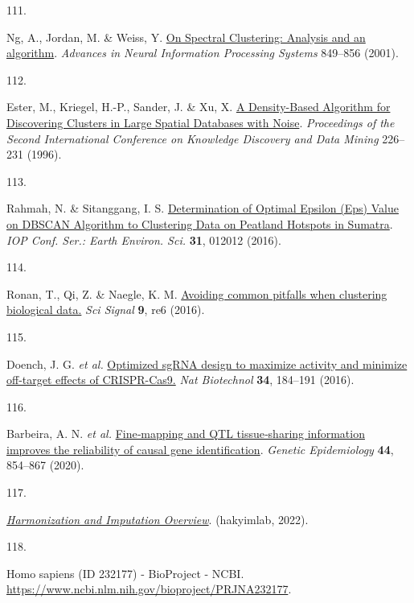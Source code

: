 \documentclass[
  a4paper,
]{article}
\newlength{\cslhangindent}
\newlength{\csllabelwidth}
\newlength{\cslentryspacingunit} %
\newenvironment{CSLReferences}[2] %
 {%
  \setlength{\parindent}{0pt}
  \ifodd #1
  \let\oldpar\par
  \def\par{\hangindent=\cslhangindent\oldpar}
  \fi
  \setlength{\parskip}{#2\cslentryspacingunit}
 }%
 {}
\newcommand{\CSLLeftMargin}[1]{\parbox[t]{\csllabelwidth}{#1}}
\newcommand{\CSLRightInline}[1]{\parbox[t]{\linewidth - \csllabelwidth}{#1}\break}
\begin{document}
\begin{CSLReferences}{0}{0}
\leavevmode{}%
\CSLLeftMargin{111. }%
\CSLRightInline{Ng, A., Jordan, M. \& Weiss, Y. \href{https://ai.stanford.edu/~ang/papers/nips01-spectral.pdf}{On Spectral Clustering: Analysis and an algorithm}. \emph{Advances in Neural Information Processing Systems} 849--856 (2001).}

\leavevmode{}%
\CSLLeftMargin{112. }%
\CSLRightInline{Ester, M., Kriegel, H.-P., Sander, J. \& Xu, X. \href{https://www.aaai.org/Papers/KDD/1996/KDD96-037.pdf}{A Density-Based Algorithm for Discovering Clusters in Large Spatial Databases with Noise}. \emph{Proceedings of the Second International Conference on Knowledge Discovery and Data Mining} 226--231 (1996).}

\leavevmode{}%
\CSLLeftMargin{113. }%
\CSLRightInline{Rahmah, N. \& Sitanggang, I. S. \href{https://doi.org/10.1088/1755-1315/31/1/012012}{Determination of Optimal Epsilon (Eps) Value on DBSCAN Algorithm to Clustering Data on Peatland Hotspots in Sumatra}. \emph{IOP Conf. Ser.: Earth Environ. Sci.} \textbf{31}, 012012 (2016).}

\leavevmode{}%
\CSLLeftMargin{114. }%
\CSLRightInline{Ronan, T., Qi, Z. \& Naegle, K. M. \href{https://doi.org/10.1126/scisignal.aad1932}{Avoiding common pitfalls when clustering biological data.} \emph{Sci Signal} \textbf{9}, re6 (2016).}

\leavevmode{}%
\CSLLeftMargin{115. }%
\CSLRightInline{Doench, J. G. \emph{et al.} \href{https://doi.org/10.1038/nbt.3437}{Optimized sgRNA design to maximize activity and minimize off-target effects of CRISPR-Cas9.} \emph{Nat Biotechnol} \textbf{34}, 184--191 (2016).}

\leavevmode{}%
\CSLLeftMargin{116. }%
\CSLRightInline{Barbeira, A. N. \emph{et al.} \href{https://doi.org/10.1002/gepi.22346}{Fine‐mapping and QTL tissue‐sharing information improves the reliability of causal gene identification}. \emph{Genetic Epidemiology} \textbf{44}, 854--867 (2020).}

\leavevmode{}%
\CSLLeftMargin{117. }%
\CSLRightInline{\emph{\href{https://github.com/hakyimlab/summary-gwas-imputation}{Harmonization and Imputation Overview}}. (hakyimlab, 2022).}

\leavevmode{}%
\CSLLeftMargin{118. }%
\CSLRightInline{Homo sapiens (ID 232177) - BioProject - NCBI. \url{https://www.ncbi.nlm.nih.gov/bioproject/PRJNA232177}.}

\end{CSLReferences}
\end{document}
